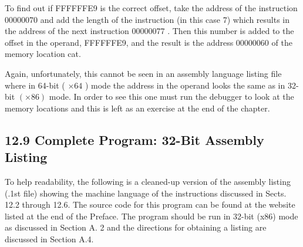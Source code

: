 \documentclass[10pt]{book}
\begin{document}
\begin{center}
\begin{center}
\begin{center}
\begin{center}
\begin{center}
To find out if FFFFFFE9 is the correct offset, take the address of the instruction 00000070 and add the length of the instruction (in this case 7) which results in the address of the next instruction 00000077 . Then this number is added to the offset in the operand, FFFFFFE9, and the result is the address 00000060 of the memory location cat.

Again, unfortunately, this cannot be seen in an assembly language listing file where in 64-bit ( $\times 64$ ) mode the address in the operand looks the same as in 32-bit $(\times 86)$ mode. In order to see this one must run the debugger to look at the memory locations and this is left as an exercise at the end of the chapter.

\subsection*{12.9 Complete Program: 32-Bit Assembly Listing}
To help readability, the following is a cleaned-up version of the assembly listing (.1st file) showing the machine language of the instructions discussed in Sects. 12.2 through 12.6. The source code for this program can be found at the website listed at the end of the Preface. The program should be run in 32-bit (x86) mode as discussed in Section A. 2 and the directions for obtaining a listing are discussed in Section A.4.



\end{center}
\end{center}
\end{center}
\end{center}
\end{center}
\end{document}
